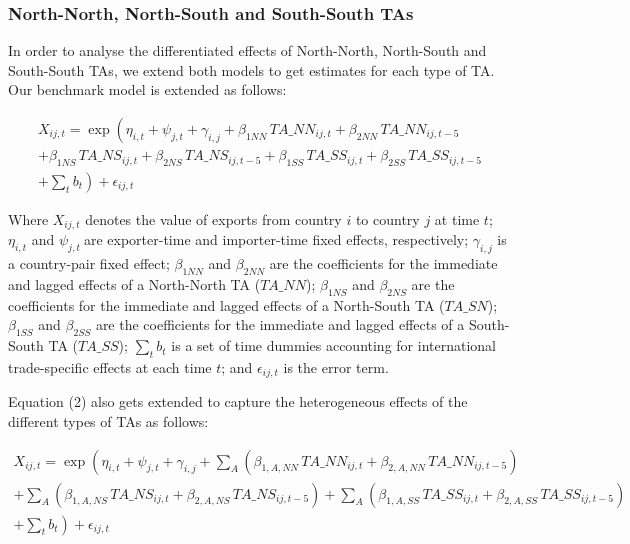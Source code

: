 \documentclass[12pt]{article}%
\begin{document}
\subsubsection{North{-}North, North{-}South and South{-}South TAs}%
\label{ssubsec:North{-}North,North{-}SouthandSouth{-}SouthTAs}%

%
In order to analyse the differentiated effects of North-North,
North-South and South-South TAs, we extend both models to get estimates
for each type of TA. Our benchmark model is extended as follows:

\begin{multline}
    X_{ij,t} = \exp\left(\eta_{i,t} + \psi_{j,t} + \gamma_{i,j} + \beta_{1NN} \, TA\_NN_{ij,t} + \beta_{2NN} \, TA\_NN_{ij,t-5} \right. \\
    + \beta_{1NS} \, TA\_NS_{ij,t} + \beta_{2NS} \, TA\_NS_{ij,t-5} + \beta_{1SS} \, TA\_SS_{ij,t} + \beta_{2SS} \, TA\_SS_{ij,t-5} \\
    + \left. \sum_{t} b_{t} \right) + \epsilon_{ij,t}
\end{multline}

Where \(X_{ij,t}\)\hspace{0pt} denotes the value of exports from country
\(i\) to country \(j\) at time \(t\); \(\eta_{i,t}\) and
\(\psi_{j,t}\ \)are exporter-time and importer-time fixed effects,
respectively; \(\gamma_{i,j}\) is a country-pair fixed effect;
\hspace{0pt}\(\beta_{1NN}\) and \(\beta_{2NN}\) are the coefficients for
the immediate and lagged effects of a North-North TA (\(TA\_ NN\));
\hspace{0pt}\hspace{0pt}\(\beta_{1NS}\) and \(\beta_{2NS}\) are the
coefficients for the immediate and lagged effects of a North-South TA
(\(TA\_ SN\)); \hspace{0pt}\hspace{0pt}\(\beta_{1SS}\) and
\(\beta_{2SS}\) are the coefficients for the immediate and lagged
effects of a South-South TA (\(TA\_ SS\)); \(\sum_{t}^{}b_{t}\) is a set
of time dummies accounting for international trade-specific effects at
each time \(t\); and \(\epsilon_{ij,t}\) is the error term.

Equation (2) also gets extended to capture the heterogeneous effects of
the different types of TAs as follows:

\begin{multline}
    X_{ij,t} = \exp\left(\eta_{i,t} + \psi_{j,t} + \gamma_{i,j} + \sum_{A}\left(\beta_{1,A,NN} \, TA\_NN_{ij,t} + \beta_{2,A,NN} \, TA\_NN_{ij,t-5}\right) \right. \\
    + \sum_{A}\left(\beta_{1,A,NS} \, TA\_NS_{ij,t} + \beta_{2,A,NS} \, TA\_NS_{ij,t-5}\right) + \sum_{A}\left(\beta_{1,A,SS} \, TA\_SS_{ij,t} + \beta_{2,A,SS} \, TA\_SS_{ij,t-5}\right) \\
    + \left. \sum_{t} b_{t} \right) + \epsilon_{ij,t}
\end{multline}
\end{document}
